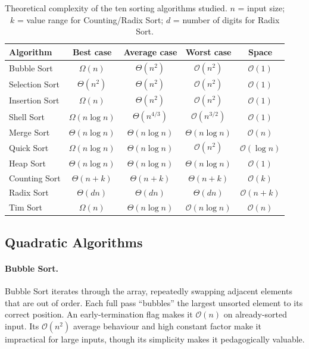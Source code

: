 \documentclass[11pt,a4paper]{article}
\begin{document}
\begin{table}[H]
\centering
\caption{Theoretical complexity of the ten sorting algorithms studied.
  $n$ = input size; $k$ = value range for Counting/Radix Sort;
  $d$ = number of digits for Radix Sort.}
\label{tab:complexity}
\small
\renewcommand{\arraystretch}{1.25}
\begin{tabular}{@{}lcccc@{}}
\toprule
\textbf{Algorithm} & \textbf{Best case} & \textbf{Average case} & \textbf{Worst case} & \textbf{Space} \\
\midrule
Bubble Sort    & $\Omega(n)$           & $\Theta(n^2)$          & $\mathcal{O}(n^2)$    & $\mathcal{O}(1)$ \\
Selection Sort & $\Theta(n^2)$         & $\Theta(n^2)$          & $\mathcal{O}(n^2)$    & $\mathcal{O}(1)$ \\
Insertion Sort & $\Omega(n)$           & $\Theta(n^2)$          & $\mathcal{O}(n^2)$    & $\mathcal{O}(1)$ \\
Shell Sort     & $\Omega(n\log n)$     & $\Theta(n^{4/3})$      & $\mathcal{O}(n^{3/2})$& $\mathcal{O}(1)$ \\
Merge Sort     & $\Theta(n\log n)$     & $\Theta(n\log n)$      & $\Theta(n\log n)$     & $\mathcal{O}(n)$ \\
Quick Sort     & $\Omega(n\log n)$     & $\Theta(n\log n)$      & $\mathcal{O}(n^2)$    & $\mathcal{O}(\log n)$ \\
Heap Sort      & $\Theta(n\log n)$     & $\Theta(n\log n)$      & $\Theta(n\log n)$     & $\mathcal{O}(1)$ \\
Counting Sort  & $\Theta(n+k)$         & $\Theta(n+k)$          & $\Theta(n+k)$         & $\mathcal{O}(k)$ \\
Radix Sort     & $\Theta(dn)$          & $\Theta(dn)$           & $\Theta(dn)$          & $\mathcal{O}(n+k)$ \\
Tim Sort       & $\Omega(n)$           & $\Theta(n\log n)$      & $\mathcal{O}(n\log n)$& $\mathcal{O}(n)$ \\
\bottomrule
\end{tabular}
\end{table}

\subsection{Quadratic Algorithms}

\paragraph{Bubble Sort.}
Bubble Sort iterates through the array, repeatedly swapping adjacent elements that are
out of order. Each full pass ``bubbles'' the largest unsorted element to its correct
position. An early-termination flag makes it $\mathcal{O}(n)$ on already-sorted input.
Its $\mathcal{O}(n^2)$ average behaviour and high constant factor make it impractical
for large inputs, though its simplicity makes it pedagogically valuable.
\end{document}
